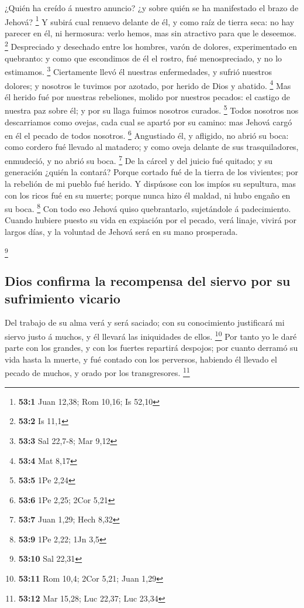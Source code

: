  ¿Quién ha creído á nuestro anuncio? ¿y sobre quién se ha
manifestado el brazo de Jehová? \footnote{\textbf{53:1} Juan 12,38; Rom
  10,16; Is 52,10}  Y subirá cual renuevo delante de él, y
como raíz de tierra seca: no hay parecer en él, ni hermosura: verlo
hemos, mas sin atractivo para que le deseemos. \footnote{\textbf{53:2}
  Is 11,1}  Despreciado y desechado entre los hombres,
varón de dolores, experimentado en quebranto: y como que escondimos de
él el rostro, fué menospreciado, y no lo estimamos. \footnote{\textbf{53:3}
  Sal 22,7-8; Mar 9,12}  Ciertamente llevó él nuestras
enfermedades, y sufrió nuestros dolores; y nosotros le tuvimos por
azotado, por herido de Dios y abatido. \footnote{\textbf{53:4} Mat 8,17}
 Mas él herido fué por nuestras rebeliones, molido por
nuestros pecados: el castigo de nuestra paz sobre él; y por su llaga
fuimos nosotros curados. \footnote{\textbf{53:5} 1Pe 2,24}
 Todos nosotros nos descarriamos como ovejas, cada cual se
apartó por su camino: mas Jehová cargó en él el pecado de todos
nosotros. \footnote{\textbf{53:6} 1Pe 2,25; 2Cor 5,21} 
Angustiado él, y afligido, no abrió su boca: como cordero fué llevado al
matadero; y como oveja delante de sus trasquiladores, enmudeció, y no
abrió su boca. \footnote{\textbf{53:7} Juan 1,29; Hech 8,32}
 De la cárcel y del juicio fué quitado; y su generación
¿quién la contará? Porque cortado fué de la tierra de los vivientes; por
la rebelión de mi pueblo fué herido.  Y dispúsose con los
impíos su sepultura, mas con los ricos fué en su muerte; porque nunca
hizo él maldad, ni hubo engaño en su boca. \footnote{\textbf{53:9} 1Pe
  2,22; 1Jn 3,5}  Con todo eso Jehová quiso quebrantarlo,
sujetándole á padecimiento. Cuando hubiere puesto su vida en expiación
por el pecado, verá linaje, vivirá por largos días, y la voluntad de
Jehová será en su mano prosperada.

\footnote{\textbf{53:10} Sal 22,31}

\hypertarget{dios-confirma-la-recompensa-del-siervo-por-su-sufrimiento-vicario}{%
\subsection{Dios confirma la recompensa del siervo por su sufrimiento
vicario}\label{dios-confirma-la-recompensa-del-siervo-por-su-sufrimiento-vicario}}

 Del trabajo de su alma verá y será saciado; con su
conocimiento justificará mi siervo justo á muchos, y él llevará las
iniquidades de ellos. \footnote{\textbf{53:11} Rom 10,4; 2Cor 5,21; Juan
  1,29}  Por tanto yo le daré parte con los grandes, y
con los fuertes repartirá despojos; por cuanto derramó su vida hasta la
muerte, y fué contado con los perversos, habiendo él llevado el pecado
de muchos, y orado por los transgresores. \footnote{\textbf{53:12} Mar
  15,28; Luc 22,37; Luc 23,34}

